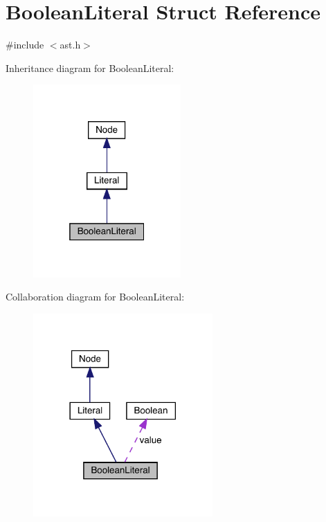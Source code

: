 \hypertarget{struct_boolean_literal}{}\section{Boolean\+Literal Struct Reference}
\label{struct_boolean_literal}


{\ttfamily \#include $<$ast.\+h$>$}



Inheritance diagram for Boolean\+Literal\+:
\nopagebreak
\begin{figure}[H]
\begin{center}
\leavevmode
\includegraphics[width=160pt]{struct_boolean_literal__inherit__graph}
\end{center}
\end{figure}


Collaboration diagram for Boolean\+Literal\+:
\nopagebreak
\begin{figure}[H]
\begin{center}
\leavevmode
\includegraphics[width=194pt]{struct_boolean_literal__coll__graph}
\end{center}
\end{figure}
